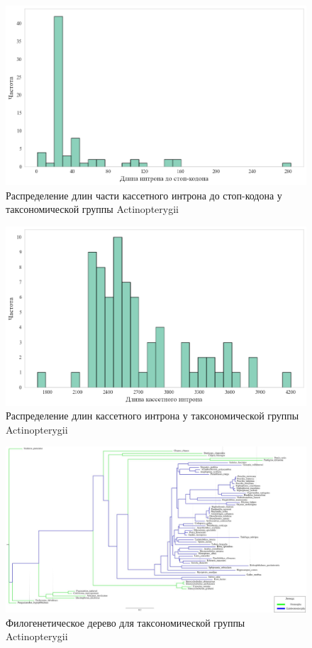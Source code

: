 \newpage
\begin{figure}[h] %
    \centering
    \includegraphics[width=1.0\textwidth]{images/Actinopterygii_intron_stop}
    \caption{Распределение длин части кассетного интрона до стоп-кодона у таксономической группы Actinopterygii}
    \label{fig:Actinopterygii_intron_stop}
\end{figure}

\newpage
\begin{figure}[h] %
    \centering
    \includegraphics[width=1.0\textwidth]{images/Actinopterygii_intron}
    \caption{Распределение длин кассетного интрона у таксономической группы Actinopterygii}
    \label{fig:Actinopterygii_intron}
\end{figure}


\newpage
\begin{figure}[h] %
    \centering
    \includegraphics[width=1.0\textwidth]{images/Actinopterygii_tree}
    \caption{Филогенетическое дерево для таксономической группы Actinopterygii}
    \label{fig:Actinopterygii_tree}
\end{figure}

